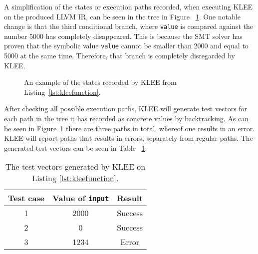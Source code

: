 A simplification of the states or execution paths recorded, when executing KLEE
on the produced LLVM IR, can be seen in the tree in Figure
~\ref{figure:kleetree}.  One notable change is that the third conditional
branch, where \texttt{value} is compared against the number $5000$ has
completely disappeared. This is because the SMT solver has proven that the
symbolic value \texttt{value} cannot be smaller than 2000 and equal to 5000 at
the same time.  Therefore, that branch is completely disregarded by KLEE\@.
\begin{figure}[h]
    \centering
    \caption{An example of the states recorded by KLEE from Listing~\ref{lst:kleefunction}.}
    \label{figure:kleetree}
\end{figure}
After checking all possible execution paths, KLEE will generate test vectors
for each path in the tree it has recorded as concrete values by backtracking.
As can be seen in Figure~\ref{figure:kleetree} there are three paths in total,
whereof one results in an error. KLEE will report paths that results in errors,
separately from regular paths. The generated test vectors can be seen in Table
~\ref{tab:kleeexample}.

\begin{table}[h]
    \centering
    \begin{tabular}{||c c c||}
        \hline
        Test case & Value of \texttt{input} & Result \\ [0.5ex]
        \hline\hline
        1 & 2000 & Success\\
        \hline
        2 & 0 & Success \\
        \hline
        3 & 1234 & Error \\
        \hline
    \end{tabular}
    \caption{The test vectors generated by KLEE on Listing \ref{lst:kleefunction}.}
    \label{tab:kleeexample}
\end{table}

